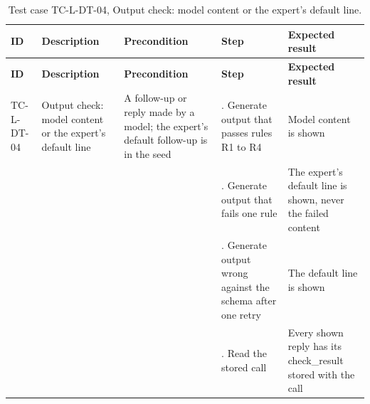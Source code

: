{\small
\begin{longtable}{|>{\raggedright\arraybackslash}p{}|>{\raggedright\arraybackslash}p{}|>{\raggedright\arraybackslash}p{}|>{\raggedright\arraybackslash}p{}|>{\raggedright\arraybackslash}p{}|}
\caption{Test case TC-L-DT-04, Output check: model content or the expert's default line.} \\
\hline
\textbf{ID} & \textbf{Description} & \textbf{Precondition} & \textbf{Step} & \textbf{Expected result} \\ \hline
\endfirsthead
\hline
\textbf{ID} & \textbf{Description} & \textbf{Precondition} & \textbf{Step} & \textbf{Expected result} \\ \hline
\endhead
TC-L-DT-04 & Output check: model content or the expert's default line & A follow-up or reply made by a model; the expert's default follow-up is in the seed & 1. Generate output that passes rules R1 to R4 & Model content is shown \\ \hline
 &  &  & 2. Generate output that fails one rule & The expert's default line is shown, never the failed content \\ \hline
 &  &  & 3. Generate output wrong against the schema after one retry & The default line is shown \\ \hline
 &  &  & 4. Read the stored call & Every shown reply has its check\_result stored with the call \\ \hline
\end{longtable}
}


